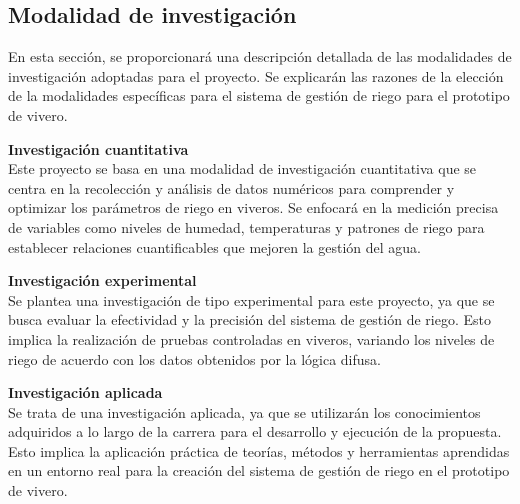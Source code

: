 \subsection{Modalidad de investigación}
En esta sección, se proporcionará una descripción detallada de las modalidades de investigación adoptadas para el proyecto. Se explicarán las razones de la elección de la modalidades específicas para el sistema de gestión de riego para el prototipo de vivero.

\bigbreak
\textbf{Investigación cuantitativa}\\
Este proyecto se basa en una modalidad de investigación cuantitativa que se centra en la recolección y análisis de datos numéricos para comprender y optimizar los parámetros de riego en viveros. Se enfocará en la medición precisa de variables como niveles de humedad, temperaturas y patrones de riego para establecer relaciones cuantificables que mejoren la gestión del agua.

\bigbreak
\textbf{Investigación experimental}\\
Se plantea una investigación de tipo experimental para este proyecto, ya que se busca evaluar la efectividad y la precisión del sistema de gestión de riego. Esto implica la realización de pruebas controladas en viveros, variando los niveles de riego de acuerdo con los datos obtenidos por la lógica difusa.

\bigbreak
\textbf{Investigación aplicada}\\
Se trata de una investigación aplicada, ya que se utilizarán los conocimientos adquiridos a lo largo de la carrera para el desarrollo y ejecución de la propuesta. Esto implica la aplicación práctica de teorías, métodos y herramientas aprendidas en un entorno real para la creación del sistema de gestión de riego en el prototipo de vivero.
